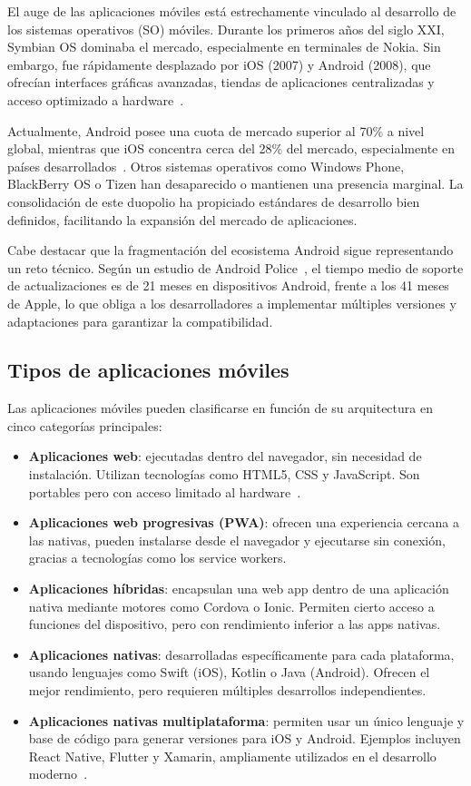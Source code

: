 El auge de las aplicaciones móviles está estrechamente vinculado al desarrollo de los sistemas operativos (SO) móviles. Durante los primeros años del siglo XXI, Symbian OS dominaba el mercado, especialmente en terminales de Nokia. Sin embargo, fue rápidamente desplazado por iOS (2007) y Android (2008), que ofrecían interfaces gráficas avanzadas, tiendas de aplicaciones centralizadas y acceso optimizado a hardware~\cite{statcounter2024}.

Actualmente, Android posee una cuota de mercado superior al 70\% a nivel global, mientras que iOS concentra cerca del 28\% del mercado, especialmente en países desarrollados~\cite{statista2024}. Otros sistemas operativos como Windows Phone, BlackBerry OS o Tizen han desaparecido o mantienen una presencia marginal. La consolidación de este duopolio ha propiciado estándares de desarrollo bien definidos, facilitando la expansión del mercado de aplicaciones.

Cabe destacar que la fragmentación del ecosistema Android sigue representando un reto técnico. Según un estudio de Android Police~\cite{androidpolice2017}, el tiempo medio de soporte de actualizaciones es de 21 meses en dispositivos Android, frente a los 41 meses de Apple, lo que obliga a los desarrolladores a implementar múltiples versiones y adaptaciones para garantizar la compatibilidad.

\subsection{Tipos de aplicaciones móviles}

Las aplicaciones móviles pueden clasificarse en función de su arquitectura en cinco categorías principales:

\begin{itemize}
    \item \textbf{Aplicaciones web}: ejecutadas dentro del navegador, sin necesidad de instalación. Utilizan tecnologías como HTML5, CSS y JavaScript. Son portables pero con acceso limitado al hardware~\cite{nguyen2018}.
    \item \textbf{Aplicaciones web progresivas (PWA)}: ofrecen una experiencia cercana a las nativas, pueden instalarse desde el navegador y ejecutarse sin conexión, gracias a tecnologías como los service workers.
    \item \textbf{Aplicaciones híbridas}: encapsulan una web app dentro de una aplicación nativa mediante motores como Cordova o Ionic. Permiten cierto acceso a funciones del dispositivo, pero con rendimiento inferior a las apps nativas.
    \item \textbf{Aplicaciones nativas}: desarrolladas específicamente para cada plataforma, usando lenguajes como Swift (iOS), Kotlin o Java (Android). Ofrecen el mejor rendimiento, pero requieren múltiples desarrollos independientes.
    \item \textbf{Aplicaciones nativas multiplataforma}: permiten usar un único lenguaje y base de código para generar versiones para iOS y Android. Ejemplos incluyen React Native, Flutter y Xamarin, ampliamente utilizados en el desarrollo moderno~\cite{gartner2022}.
\end{itemize}

